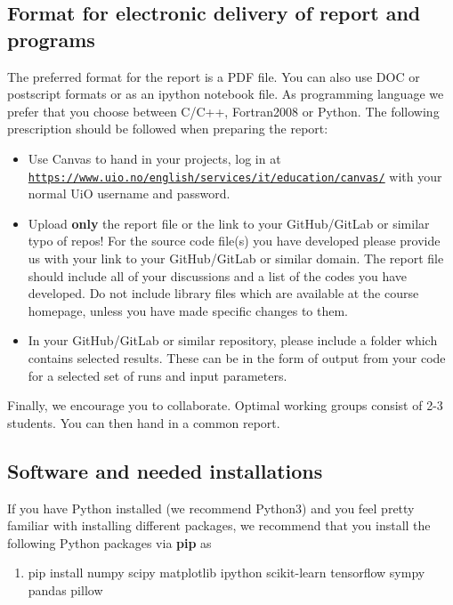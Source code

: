 \documentclass[%
oneside,                 %
final,                   %
10pt]{article}
\begin{document}
\noindent
\subsection{Format for electronic delivery of report and programs}

The preferred format for the report is a PDF file. You can also use DOC or postscript formats or as an ipython notebook file.  As programming language we prefer that you choose between C/C++, Fortran2008 or Python. The following prescription should be followed when preparing the report:

\begin{itemize}
  \item Use Canvas to hand in your projects, log in  at  \href{{https://www.uio.no/english/services/it/education/canvas/}}{\nolinkurl{https://www.uio.no/english/services/it/education/canvas/}} with your normal UiO username and password.

  \item Upload \textbf{only} the report file or the link to your GitHub/GitLab or similar typo of  repos!  For the source code file(s) you have developed please provide us with your link to your GitHub/GitLab or similar  domain.  The report file should include all of your discussions and a list of the codes you have developed.  Do not include library files which are available at the course homepage, unless you have made specific changes to them.

  \item In your GitHub/GitLab or similar repository, please include a folder which contains selected results. These can be in the form of output from your code for a selected set of runs and input parameters.
\end{itemize}

\noindent
Finally, 
we encourage you to collaborate. Optimal working groups consist of 
2-3 students. You can then hand in a common report. 



\subsection{Software and needed installations}

If you have Python installed (we recommend Python3) and you feel pretty familiar with installing different packages, 
we recommend that you install the following Python packages via \textbf{pip} as
\begin{enumerate}
\item pip install numpy scipy matplotlib ipython scikit-learn tensorflow sympy pandas pillow
\end{enumerate}
\end{document}
